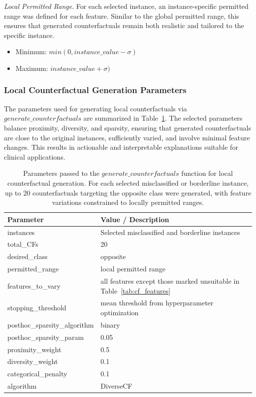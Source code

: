 \documentclass[pdflatex,sn-vancouver-num]{sn-jnl}
\begin{document}
\textit{Local Permitted Range}.
For each selected instance, an instance-specific permitted range was defined for each feature. Similar to the global permitted range, this ensures that generated counterfactuals remain both realistic and tailored to the specific instance.

\begin{itemize}
    \itemsep0em 
    \item Minimum: $min(0, instance\_value - \sigma)$
    \item Maximum: $ instance\_value + \sigma)$
\end{itemize}

\subsubsection{Local Counterfactual Generation Parameters}
The parameters used for generating local counterfactuals via $generate\_counterfactuals$ are summarized in Table~\ref{tab:local_cf}. The selected parameters balance proximity, diversity, and sparsity, ensuring that generated counterfactuals are close to the original instances, sufficiently varied, and involve minimal feature changes. This results in actionable and interpretable explanations suitable for clinical applications.

\begin{table}[h!]
\centering
\small
\begin{tabular}{ll}
\hline
\textbf{Parameter} & \textbf{Value / Description} \\
\hline
instances & Selected misclassified and borderline instances \\
total\_CFs & 20 \\
desired\_class & opposite \\
permitted\_range & local permitted range \\
features\_to\_vary & all features except those marked unsuitable in Table~\ref{tab:cf_features} \\
stopping\_threshold & mean threshold from hyperparameter optimization \\
posthoc\_sparsity\_algorithm & binary \\
posthoc\_sparsity\_param & 0.05 \\
proximity\_weight & 0.5 \\
diversity\_weight & 0.1 \\
categorical\_penalty & 0.1 \\
algorithm & DiverseCF \\
\hline
\end{tabular}
\caption{Parameters passed to the $generate\_counterfactuals$ function for local counterfactual generation. For each selected misclassified or borderline instance, up to 20 counterfactuals targeting the opposite class were generated, with feature variations constrained to locally permitted ranges.}
\label{tab:local_cf}
\end{table}
\end{document}
